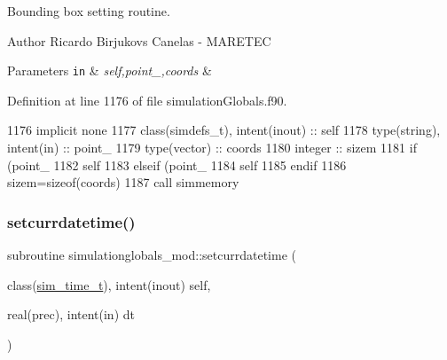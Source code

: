 Bounding box setting routine. 

\begin{DoxyAuthor}{Author}
Ricardo Birjukovs Canelas -\/ M\+A\+R\+E\+T\+EC 
\end{DoxyAuthor}

\begin{DoxyParams}[1]{Parameters}
\mbox{\tt in}  & {\em self,point\+\_\+,coords} & \\
\hline
\end{DoxyParams}


Definition at line 1176 of file simulation\+Globals.\+f90.


\begin{DoxyCode}
1176     \textcolor{keywordtype}{implicit none}
1177     \textcolor{keywordtype}{class}(simdefs\_t), \textcolor{keywordtype}{intent(inout)} :: self
1178     \textcolor{keywordtype}{type}(string), \textcolor{keywordtype}{intent(in)} :: point\_
1179     \textcolor{keywordtype}{type}(vector) :: coords
1180     \textcolor{keywordtype}{integer} :: sizem
1181     \textcolor{keywordflow}{if} (point\_%
1182         self%
1183     \textcolor{keywordflow}{elseif} (point\_%
1184         self%
1185 \textcolor{keywordflow}{    endif}
1186     sizem=sizeof(coords)
1187     \textcolor{keyword}{call }simmemory%
\end{DoxyCode}
\mbox{\label{namespacesimulationglobals__mod_acbb28eee5547a03dc28c924d8e23ad9a}} 
\subsubsection{\texorpdfstring{setcurrdatetime()}{setcurrdatetime()}}
{\footnotesize\ttfamily subroutine simulationglobals\+\_\+mod\+::setcurrdatetime (\begin{DoxyParamCaption}\item[{class(\mbox{\hyperlink{structsimulationglobals__mod_1_1sim__time__t}{sim\+\_\+time\+\_\+t}}), intent(inout)}]{self,  }\item[{real(prec), intent(in)}]{dt }\end{DoxyParamCaption})\hspace{0.3cm}{\ttfamily [private]}}



